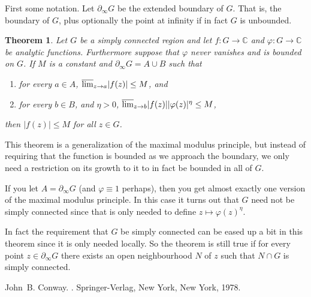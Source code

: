 \documentclass[12pt]{article}
\theoremstyle{theorem}
\newtheorem*{thm}{Theorem}
\theoremstyle{definition}
\begin{document}
First some notation.  Let $\partial_\infty G$ be the extended boundary of $G$.  That is, the boundary of $G$, plus optionally the point at infinity if in fact
$G$ is unbounded.

\begin{thm}
Let $G$ be a simply connected region and let $f \colon G \to {\mathbb{C}}$
and $\varphi \colon G \to {\mathbb{C}}$ be analytic functions.  Furthermore
suppose that $\varphi$ never vanishes and is bounded on $G$.  If $M$ is a constant
and $\partial_\infty G = A \cup B$ such that
\begin{enumerate}
\item for every $a \in A$, $\varlimsup_{z\rightarrow a} \lvert f(z) \rvert \leq M$, and
\item for every $b \in B$, and $\eta > 0$, $\varlimsup_{z \rightarrow b} \lvert f(z) \rvert \lvert \varphi(z) \rvert^\eta \leq M$,
\end{enumerate}
then $\lvert f(z) \rvert \leq M$ for all $z \in G$.
\end{thm}

This theorem is a generalization of the maximal modulus principle, but instead of requiring that the function is bounded as we approach the boundary, we only need a restriction on its growth to  it to in fact be bounded in all of $G$.

If you let $A = \partial_\infty G$ (and $\varphi \equiv 1$ perhaps), then you get almost exactly one version of the maximal modulus principle.  In this case it turns out that $G$ need not be simply connected since that is only needed to
define $z \mapsto \varphi(z)^\eta$.

In fact the requirement that $G$ be simply connected can be eased up a bit in this theorem since it is only needed locally.  So the theorem is still true if for every point
$z \in \partial_\infty G$ there exists an open neighbourhood $N$ of $z$ such
that $N \cap G$ is simply connected.

\begin{thebibliography}{9}
John~B. Conway.
{\em {}}.
Springer-Verlag, New York, New York, 1978.
\end{thebibliography}
\end{document}
